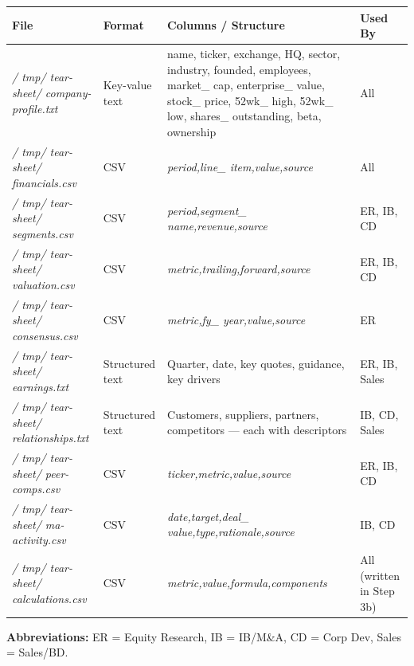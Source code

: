 \documentclass[11pt]{article}
\begin{document}
\begingroup
\small
\setlength{\tabcolsep}{2pt}
\begin{longtable}{>{\RaggedRight\arraybackslash\hspace{0pt}}p{}>{\RaggedRight\arraybackslash\hspace{0pt}}p{}>{\RaggedRight\arraybackslash\hspace{0pt}}p{}>{\RaggedRight\arraybackslash\hspace{0pt}}p{}}
\toprule
{} \textbf{File} & \textbf{Format} & \textbf{Columns /  Structure} & \textbf{Used By} \\
\midrule
{} \emph{/ tmp/ tear-sheet/ company-profile.txt} & Key-value text & name, ticker, exchange, HQ, sector, industry, founded, employees, market\_\allowbreak{} cap, enterprise\_\allowbreak{} value, stock\_\allowbreak{} price, 52wk\_\allowbreak{} high, 52wk\_\allowbreak{} low, shares\_\allowbreak{} outstanding, beta, ownership & All \\
{} \emph{/ tmp/ tear-sheet/ financials.csv} & CSV & \emph{period,line\_\allowbreak{} item,value,source} & All \\
{} \emph{/ tmp/ tear-sheet/ segments.csv} & CSV & \emph{period,segment\_\allowbreak{} name,revenue,source} & ER, IB, CD \\
{} \emph{/ tmp/ tear-sheet/ valuation.csv} & CSV & \emph{metric,trailing,forward,source} & ER, IB, CD \\
{} \emph{/ tmp/ tear-sheet/ consensus.csv} & CSV & \emph{metric,fy\_\allowbreak{} year,value,source} & ER \\
{} \emph{/ tmp/ tear-sheet/ earnings.txt} & Structured text & Quarter, date, key quotes, guidance, key drivers & ER, IB, Sales \\
{} \emph{/ tmp/ tear-sheet/ relationships.txt} & Structured text & Customers, suppliers, partners, competitors — each with descriptors & IB, CD, Sales \\
{} \emph{/ tmp/ tear-sheet/ peer-comps.csv} & CSV & \emph{ticker,metric,value,source} & ER, IB, CD \\
{} \emph{/ tmp/ tear-sheet/ ma-activity.csv} & CSV & \emph{date,target,deal\_\allowbreak{} value,type,rationale,source} & IB, CD \\
{} \emph{/ tmp/ tear-sheet/ calculations.csv} & CSV & \emph{metric,value,formula,components} & All (written in Step 3b) \\
\bottomrule
\end{longtable}
\endgroup

\textbf{Abbreviations:} ER = Equity Research, IB = IB/M\&A, CD = Corp Dev, Sales = Sales/BD.
\end{document}
